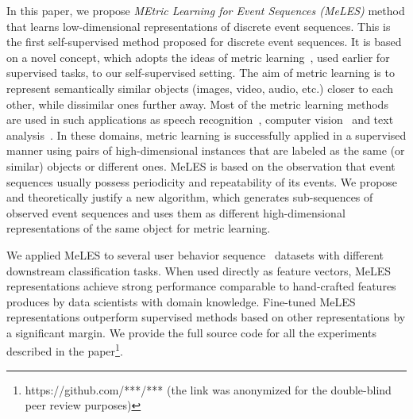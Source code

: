 \documentclass{article}
\begin{document}
In this paper, we propose \emph{MEtric Learning for Event Sequences (MeLES)} method that learns low-dimensional representations of discrete event sequences. This is the first self-supervised method proposed for discrete event sequences. It is based on a 
novel concept, which adopts the ideas of metric learning~\cite{Xing2002DistanceML, Hadsell2006DimensionalityRB}, used earlier for supervised tasks, to our self-supervised setting. The aim of metric learning is to represent semantically similar objects (images, video, audio, etc.) closer to each other, while dissimilar ones further away. Most of the metric learning methods are used in such applications as speech recognition~\cite{Wan2018GeneralizedEL}, computer vision~\cite{Schroff2015FaceNetAU, Mao2019MetricLF} and text analysis~\cite{Reimers2019SentenceBERTSE}. In these domains, metric learning is successfully applied in a supervised manner using pairs of high-dimensional instances that are labeled as the same (or similar) objects or different ones. MeLES is based on the observation that event sequences usually possess periodicity and repeatability of its events. We propose and theoretically justify a new algorithm, which generates sub-sequences of observed event sequences and uses them as different high-dimensional representations of the same object for metric learning.

We applied MeLES to several user behavior sequence~\cite{Ni2018PerceiveYU} datasets with different downstream classification tasks. When used directly as feature vectors, MeLES representations achieve strong performance comparable to hand-crafted features produces by data scientists with domain knowledge. Fine-tuned MeLES representations outperform supervised methods based on other representations by a significant margin. %
We provide the full source code for all the experiments described in the paper\footnote{https://github.com/***/*** (the link was anonymized for the double-blind peer review purposes)}.
\end{document}
